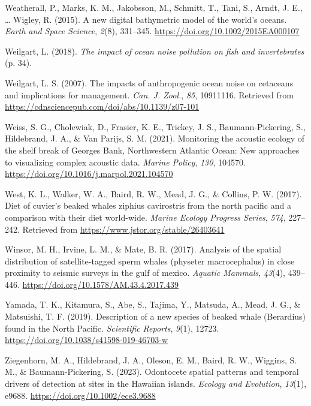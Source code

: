\documentclass[
]{article}
\newlength{\cslhangindent}
\newlength{\cslentryspacingunit} %
\newenvironment{CSLReferences}[2] %
 {%
  \setlength{\parindent}{0pt}
  \ifodd #1
  \let\oldpar\par
  \def\par{\hangindent=\cslhangindent\oldpar}
  \fi
  \setlength{\parskip}{#2\cslentryspacingunit}
 }%
 {}
\begin{document}
\begin{CSLReferences}{1}{0}
\leavevmode{}%
Weatherall, P., Marks, K. M., Jakobsson, M., Schmitt, T., Tani, S.,
Arndt, J. E., \ldots{} Wigley, R. (2015). A new digital bathymetric
model of the world's oceans. \emph{Earth and Space Science},
\emph{2}(8), 331--345. \url{https://doi.org/10.1002/2015EA000107}

\leavevmode{}%
Weilgart, L. (2018). \emph{The impact of ocean noise pollution on fish
and invertebrates} (p. 34).

\leavevmode{}%
Weilgart, L. S. (2007). The impacts of anthropogenic ocean noise on
cetaceans and implications for management. \emph{Can. J. Zool.},
\emph{85}, 10911116. Retrieved from
\url{https://cdnsciencepub.com/doi/abs/10.1139/z07-101}

\leavevmode{}%
Weiss, S. G., Cholewiak, D., Frasier, K. E., Trickey, J. S.,
Baumann-Pickering, S., Hildebrand, J. A., \& Van Parijs, S. M. (2021).
Monitoring the acoustic ecology of the shelf break of Georges Bank,
Northwestern Atlantic Ocean: New approaches to visualizing complex
acoustic data. \emph{Marine Policy}, \emph{130}, 104570.
\url{https://doi.org/10.1016/j.marpol.2021.104570}

\leavevmode{}%
West, K. L., Walker, W. A., Baird, R. W., Mead, J. G., \& Collins, P. W.
(2017). Diet of cuvier{'}s beaked whales ziphius cavirostris from the
north pacific and a comparison with their diet world-wide. \emph{Marine
Ecology Progress Series}, \emph{574}, 227--242. Retrieved from
\url{https://www.jstor.org/stable/26403641}

\leavevmode{}%
Winsor, M. H., Irvine, L. M., \& Mate, B. R. (2017). Analysis of the
spatial distribution of satellite-tagged sperm whales (physeter
macrocephalus) in close proximity to seismic surveys in the gulf of
mexico. \emph{Aquatic Mammals}, \emph{43}(4), 439--446.
\url{https://doi.org/10.1578/AM.43.4.2017.439}

\leavevmode{}%
Yamada, T. K., Kitamura, S., Abe, S., Tajima, Y., Matsuda, A., Mead, J.
G., \& Matsuishi, T. F. (2019). Description of a new species of beaked
whale (Berardius) found in the North Pacific. \emph{Scientific Reports},
\emph{9}(1), 12723. \url{https://doi.org/10.1038/s41598-019-46703-w}

\leavevmode{}%
Ziegenhorn, M. A., Hildebrand, J. A., Oleson, E. M., Baird, R. W.,
Wiggins, S. M., \& Baumann-Pickering, S. (2023). Odontocete spatial
patterns and temporal drivers of detection at sites in the Hawaiian
islands. \emph{Ecology and Evolution}, \emph{13}(1), e9688.
\url{https://doi.org/10.1002/ece3.9688}

\end{CSLReferences}
\end{document}
